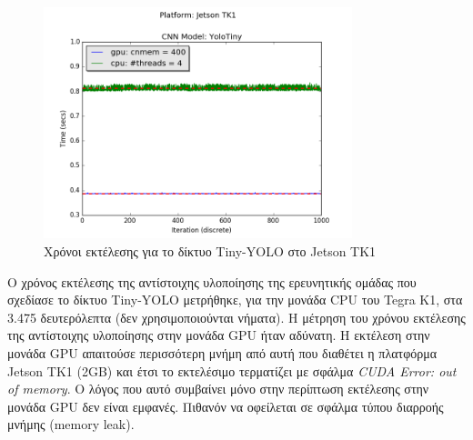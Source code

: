 \begin{figure}[H]
  \centering
  \includegraphics[width=0.8\textwidth]{./images/chapter6/benchmark_yolotiny_jetson.png}
  \caption[Χρόνoι εκτέλεσης για το δίκτυο Tiny-YOLO στο Jetson TK1]{Χρόνοι εκτέλεσης για το δίκτυο Tiny-YOLO στο Jetson TK1}
  \label{fig:yolotiny_results_jetson}
\end{figure}

Ο χρόνος εκτέλεσης της αντίστοιχης υλοποίησης της ερευνητικής ομάδας που
σχεδίασε το δίκτυο Tiny-YOLO μετρήθηκε, για την μονάδα CPU του Tegra K1,
στα 3.475 δευτερόλεπτα (δεν χρησιμοποιούνται νήματα).
Η μέτρηση του χρόνου εκτέλεσης της αντίστοιχης
υλοποίησης στην μονάδα GPU ήταν αδύνατη. Η εκτέλεση στην μονάδα GPU
απαιτούσε περισσότερη μνήμη από αυτή που διαθέτει η πλατφόρμα Jetson TK1 (2GB) και έτσι
το εκτελέσιμο τερματίζει με σφάλμα \emph{CUDA Error: out of memory}.
Ο λόγος που αυτό συμβαίνει μόνο στην περίπτωση εκτέλεσης στην μονάδα GPU
δεν είναι εμφανές. Πιθανόν να οφείλεται σε σφάλμα τύπου διαρροής μνήμης (memory leak).

